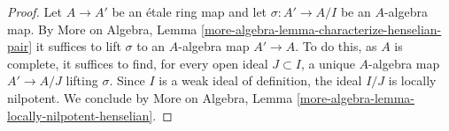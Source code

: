 \documentclass{stacks-project}
\theoremstyle{plain}
\theoremstyle{definition}
\theoremstyle{remark}
\numberwithin{equation}{subsection}
\begin{document}
\begin{proof}
Let $A \to A'$ be an \'etale ring map and let $\sigma : A' \to A/I$
be an $A$-algebra map. By More on Algebra, Lemma
\ref{more-algebra-lemma-characterize-henselian-pair} it suffices
to lift $\sigma$ to an $A$-algebra map $A' \to A$.
To do this, as $A$ is complete, it suffices to find,
for every open ideal $J \subset I$, a unique $A$-algebra map $A' \to A/J$
lifting $\sigma$. Since $I$ is a weak ideal of definition,
the ideal $I/J$ is locally nilpotent. We conclude by
More on Algebra, Lemma \ref{more-algebra-lemma-locally-nilpotent-henselian}.
\end{proof}
\end{document}
